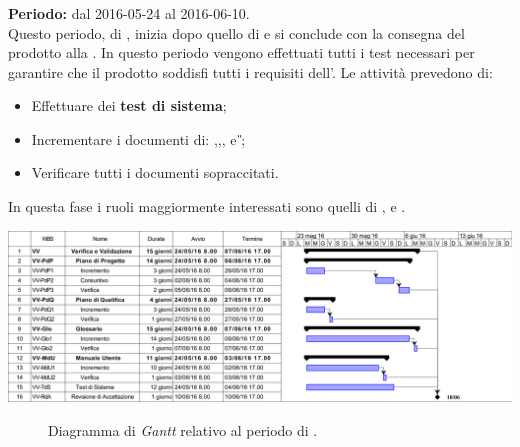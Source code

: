 \subsubsection{\VV}
\textbf{Periodo:} dal 2016-05-24 al 2016-06-10. \\
Questo periodo, di \VV, inizia dopo quello di \CO  e si conclude con la consegna del prodotto alla \RA. In questo periodo vengono effettuati tutti i test necessari per garantire che il prodotto soddisfi tutti i requisiti dell'\AR.  
Le attività prevedono di:
\begin{itemize}
	\item Effettuare dei \textbf{test di sistema};  
	\item Incrementare i documenti di: \textit{\MU},\textit{\NdP},\textit{\PdP}, \textit{\PdQ} e \textit{\G};
	\item Verificare tutti i documenti sopraccitati.
\end{itemize}
In questa fase i ruoli maggiormente interessati sono quelli di \textit{\Res}, \textit{\Prog} e \textit{\Ver}. 
\newpage
\begin{center}
	\includegraphics[keepaspectratio = true, width=16cm]{immagini/PdP_VerificaEValidazioneGantt.png}
\end{center}
\begin{figure}[h]
	\caption{Diagramma di \textit{Gantt} relativo al periodo di \VV.}\label{etichetta}
\end{figure}
